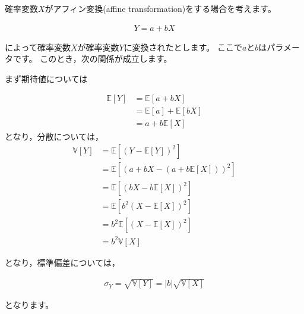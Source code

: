 \documentclass[
  letterpaper,
  pandoc,
  ja=standard,
  jafont = hiragino-pron]{ltjsbook}
\begin{document}
確率変数\(X\)がアフィン変換(affine transformation)をする場合を考えます。

\[
\begin{aligned}
Y = a + bX
\end{aligned}
\]

によって確率変数\(X\)が確率変数\(Y\)に変換されたとします。
ここで\(a\)と\(b\)はパラメータです。 このとき，次の関係が成立します。

まず期待値については

\[
\begin{aligned}
\mathbb{E}[Y] &= \mathbb{E}[a + bX] \nonumber \\
       &= \mathbb{E}[a] + \mathbb{E}[bX] \nonumber\\
       &= a + b \mathbb{E}[X]
\end{aligned}
\] となり，分散については， \[
\begin{aligned}
\mathbb{V}[Y]
        &= \mathbb{E}[(Y - \mathbb{E}[Y])^2]      \nonumber \\
        &= \mathbb{E}[(a + bX - (a+b\mathbb{E}[X]))^2] \nonumber\\
        &= \mathbb{E}[(bX - b \mathbb{E}[X])^2]   \nonumber\\
        &= \mathbb{E}[b^2 (X - \mathbb{E}[X])^2]  \nonumber\\
        &= b^2 \mathbb{E}[ (X - \mathbb{E}[X])^2] \nonumber\\
        &= b^2 \mathbb{V}[X]
\end{aligned}
\]

となり，標準偏差については，

\[
\begin{aligned}
\sigma _Y = \sqrt{\mathbb{V}[Y]} = |b| \sqrt{\mathbb{V}[X]}
\end{aligned}
\]

となります。
\end{document}
